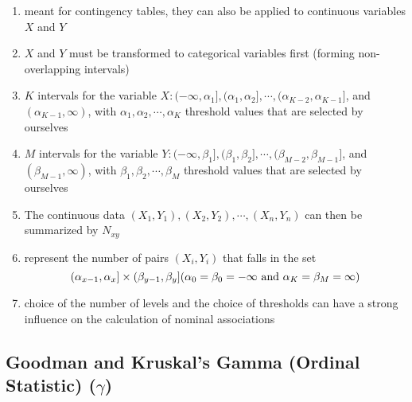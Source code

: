 \begin{enumerate}
    \item meant for contingency tables, they can also be applied to continuous variables $X$ and $Y$

    \item $X$ and $Y$ must be transformed to categorical variables first (forming non-overlapping intervals)

    \item $K$ intervals for the variable $X: (-\infty, \alpha_1], (\alpha_1, \alpha_2],\cdots,(\alpha_{K-2}, \alpha_{K-1}]$, and $(\alpha_{K-1},\infty)$, with $\alpha_1, \alpha_2,\cdots, \alpha_K$ threshold values that are selected by ourselves

    \item $M$ intervals for the variable $Y: (-\infty, \beta_1], (\beta_1, \beta_2],\cdots,(\beta_{M-2}, \beta_{M-1}]$, and $(\beta_{M-1},\infty)$, with $\beta_1, \beta_2,\cdots, \beta_M$ threshold values that are selected by ourselves

    \item The continuous data $(X_1, Y_1), (X_2, Y_2), \cdots , (X_n, Y_n)$ can then be summarized by $N_{xy}$ 

    \item represent the number of pairs $(X_i, Y_i)$ that falls in the set 
    \[
        (\alpha_{x-1}, \alpha_x] \times (\beta_{y-1}, \beta_y] 
        \hfill
        (\alpha_0 = \beta_0 = -\infty \text{ and } \alpha_K = \beta_M = \infty)
    \]

    \item choice of the number of levels and the choice of thresholds can have a strong influence on the calculation of nominal associations
\end{enumerate}


\subsection{Goodman and Kruskal’s Gamma (Ordinal Statistic) ($\gamma$) \cite{ism-1}} \label{Multivariate Distributions: Goodman and Kruskal’s Gamma (Ordinal Statistic)}


